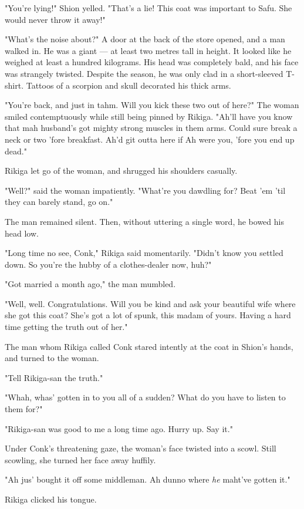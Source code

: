 "You're lying!" Shion yelled. "That's a lie! This coat was important to
Safu. She would never throw it away!"

"What's the noise about?" A door at the back of the store opened, and a
man walked in. He was a giant --- at least two metres tall in height. It
looked like he weighed at least a hundred kilograms. His head was
completely bald, and his face was strangely twisted. Despite the season,
he was only clad in a short-sleeved T-shirt. Tattoos of a scorpion and
skull decorated his thick arms.

"You're back, and just in tahm. Will you kick these two out of here?"
The woman smiled contemptuously while still being pinned by Rikiga.
"Ah'll have you know that mah husband's got mighty strong muscles in
them arms. Could sure break a neck or two 'fore breakfast. Ah'd git
outta here if Ah were you, 'fore you end up dead."

Rikiga let go of the woman, and shrugged his shoulders casually.

"Well?" said the woman impatiently. "What're you dawdling for? Beat 'em
'til they can barely stand, go on."

The man remained silent. Then, without uttering a single word, he bowed
his head low.

"Long time no see, Conk," Rikiga said momentarily. "Didn't know you
settled down. So you're the hubby of a clothes-dealer now, huh?"

"Got married a month ago," the man mumbled.

"Well, well. Congratulations. Will you be kind and ask your beautiful
wife where she got this coat? She's got a lot of spunk, this madam of
yours. Having a hard time getting the truth out of her."

The man whom Rikiga called Conk stared intently at the coat in Shion's
hands, and turned to the woman.

"Tell Rikiga-san the truth."

"Whah, whas' gotten in to you all of a sudden? What do you have to
listen to them for?"

"Rikiga-san was good to me a long time ago. Hurry up. Say it."

Under Conk's threatening gaze, the woman's face twisted into a scowl.
Still scowling, she turned her face away huffily.

"Ah jus' bought it off some middleman. Ah dunno where \emph{he} maht've gotten
it."

Rikiga clicked his tongue.


